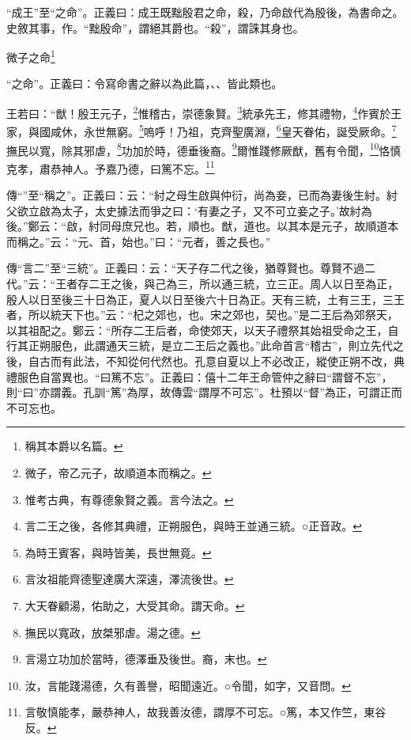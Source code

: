 {\noindent\shu{}\fzkt “成王”至“之命”。正義曰：成王既黜殷君之命，殺，乃命啟代為殷後，為書命之。史敘其事，作。“黜殷命”，謂絕其爵也。“殺”，謂誅其身也。 \par}

微子之命\footnote{稱其本爵以名篇。}

{\noindent\shu{}\fzkt “之命”。正義曰：令寫命書之辭以為此篇，、、皆此類也。 \par}

王若曰：“猷！殷王元子，\footnote{微子，帝乙元子，故順道本而稱之。}惟稽古，崇德象賢。\footnote{惟考古典，有尊德象賢之義。言今法之。}統承先王，修其禮物，\footnote{言二王之後，各修其典禮，正朔服色，與時王並通三統。○正音政。}作賓於王家，與國咸休，永世無窮。\footnote{為時王賓客，與時皆美，長世無竟。}嗚呼！乃祖，克齊聖廣淵，\footnote{言汝祖能齊德聖達廣大深遠，澤流後世。}皇天眷佑，誕受厥命。\footnote{大天眷顧湯，佑助之，大受其命。謂天命。}撫民以寬，除其邪虐，\footnote{撫民以寬政，放桀邪虐。湯之德。}功加於時，德垂後裔。\footnote{言湯立功加於當時，德澤垂及後世。裔，末也。}爾惟踐修厥猷，舊有令聞，\footnote{汝，言能踐湯德，久有善譽，昭聞遠近。○令聞，如字，又音問。}恪慎克孝，肅恭神人。予嘉乃德，曰篤不忘。\footnote{言敬慎能孝，嚴恭神人，故我善汝德，謂厚不可忘。○篤，本又作竺，東谷反。}


{\noindent\zhuan{}\fzbyks 傳“”至“稱之”。正義曰：云：“紂之母生啟與仲衍，尚為妾，已而為妻後生紂。紂父欲立啟為太子，太史據法而爭之曰：‘有妻之子，又不可立妾之子。’故紂為後。”鄭云：“啟，紂同母庶兄也。若，順也。猷，道也。以其本是元子，故順道本而稱之。”云：“元、首，始也。”曰：“元者，善之長也。” \par}

{\noindent\zhuan{}\fzbyks 傳“言二”至“三統”。正義曰：云：“天子存二代之後，猶尊賢也。尊賢不過二代。”云：“王者存二王之後，與己為三，所以通三統，立三正。周人以日至為正，殷人以日至後三十日為正，夏人以日至後六十日為正。天有三統，土有三王，三王者，所以統天下也。”云：“杞之郊也，也。宋之郊也，契也。”是二王后為郊祭天，以其祖配之。鄭云：“所存二王后者，命使郊天，以天子禮祭其始祖受命之王，自行其正朔服色，此謂通天三統，是立二王后之義也。”此命首言“稽古”，則立先代之後，自古而有此法，不知從何代然也。孔意自夏以上不必改正，縱使正朔不改，典禮服色自當異也。“曰篤不忘”。正義曰：僖十二年王命管仲之辭曰“謂督不忘”，則“曰”亦謂義。孔訓“篤”為厚，故傳雲“謂厚不可忘”。杜預以“督”為正，可謂正而不可忘也。 \par}

